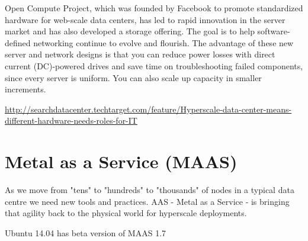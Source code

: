 Open Compute Project,  which was founded by Facebook to promote standardized
hardware for web-scale data centers, has led to rapid innovation in the server
market and has also developed a storage offering. 
The goal is to help  software-defined networking continue to evolve and
flourish. The advantage of these new server and network designs is that you can
reduce power losses with direct current (DC)-powered drives and save time on
troubleshooting failed components, since every server is uniform. You can also
scale up capacity in smaller increments.  


\url{http://searchdatacenter.techtarget.com/feature/Hyperscale-data-center-means-different-hardware-needs-roles-for-IT}


\section{Metal as a Service (MAAS)}

As we move from "tens" to "hundreds" to "thousands" of nodes in a typical data
centre we need new tools and practices.  AAS - Metal as a Service - is bringing
that agility back to the physical world for hyperscale deployments.

Ubuntu 14.04 has beta version of MAAS 1.7
